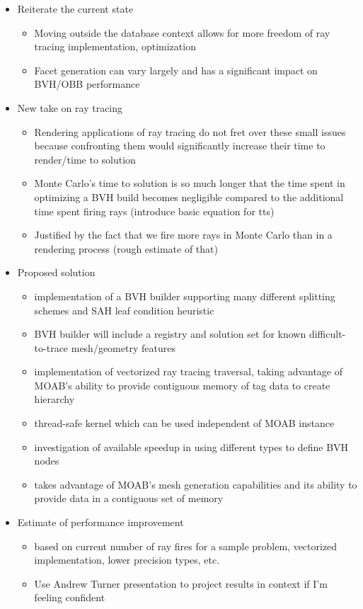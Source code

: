\documentclass[10pt, a4paper]{article}
\begin{document}
\begin{itemize}
\item Reiterate the current state
  \begin{itemize}
  \item Moving outside the database context allows for more freedom of ray tracing implementation, optimization
  \item Facet generation can vary largely and has a significant impact on BVH/OBB performance
  \end{itemize}
\item New take on ray tracing
  \begin{itemize}
  \item Rendering applications of ray tracing do not fret over these small issues because confronting them would significantly increase their time to render/time to solution
  \item Monte Carlo's time to solution is so much longer that the time spent in optimizing a BVH build becomes negligible compared to the additional time spent firing rays (introduce basic equation for tts)
  \item Justified by the fact that we fire more rays in Monte Carlo than in a rendering process (rough estimate of that)
  \end{itemize}
\item Proposed solution
  \begin{itemize}
  \item implementation of a BVH builder supporting many different splitting schemes and SAH leaf condition heuristic
  \item BVH builder will include a registry and solution set for known difficult-to-trace mesh/geometry features
  \item implementation of vectorized ray tracing traversal, taking advantage of MOAB's ability to provide contiguous memory of tag data to create hierarchy
  \item thread-safe kernel which can be used independent of MOAB instance
  \item investigation of available speedup in using different types to define BVH nodes
  \item takes advantage of MOAB's mesh generation capabilities and its ability to provide data in a contiguous set of memory
  \end{itemize}
\item Estimate of performance improvement
  \begin{itemize}
  \item based on current number of ray fires for a sample problem, vectorized implementation, lower precision types, etc.
  \item Use Andrew Turner presentation to project results in context if I'm feeling confident
  \end{itemize}
\end{itemize}
\end{document}
